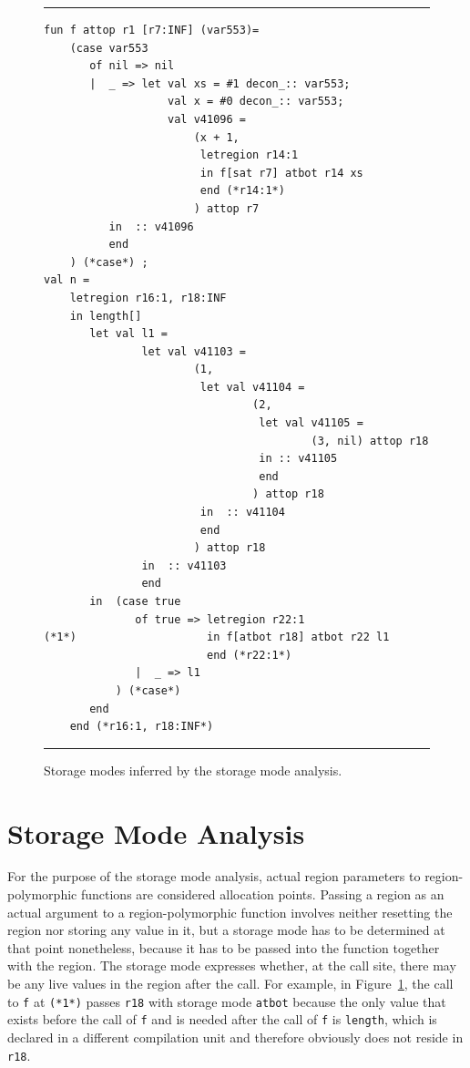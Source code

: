 \documentclass[12pt]{book}
\begin{document}
\begin{figure}
\hrule \medskip
\begin{verbatim}
fun f attop r1 [r7:INF] (var553)= 
    (case var553 
       of nil => nil
       |  _ => let val xs = #1 decon_:: var553; 
                   val x = #0 decon_:: var553; 
                   val v41096 = 
                       (x + 1, 
                        letregion r14:1 
                        in f[sat r7] atbot r14 xs 
                        end (*r14:1*)
                       ) attop r7
          in  :: v41096
          end 
    ) (*case*) ; 
val n = 
    letregion r16:1, r18:INF 
    in length[] 
       let val l1 = 
               let val v41103 = 
                       (1, 
                        let val v41104 = 
                                (2, 
                                 let val v41105 = 
                                         (3, nil) attop r18 
                                 in :: v41105 
                                 end 
                                ) attop r18
                        in  :: v41104
                        end 
                       ) attop r18
               in  :: v41103
               end 
       in  (case true 
              of true => letregion r22:1 
(*1*)                    in f[atbot r18] atbot r22 l1 
                         end (*r22:1*)
              |  _ => l1
           ) (*case*) 
       end  
    end (*r16:1, r18:INF*)
\end{verbatim}
\caption{Storage modes inferred by the storage mode analysis.}
\label{sma1.fig}
\medskip
\hrule
\end{figure}

\section{Storage Mode Analysis}
\label{sma.sec}
For the purpose of the storage mode analysis, actual region
parameters to region-polymorphic functions are considered allocation
points. Passing a region as an actual argument to a region-polymorphic
function involves neither resetting the region nor storing any value
in it, but a storage mode has to be determined at that point
nonetheless, because it has to be passed into the function together with
the region. The storage mode expresses whether, at the call site,
there may be any live values in the region after the call. For
example, in Figure~\ref{sma1.fig}, the call to {\tt f}
at {\tt (*1*)} passes {\tt r18} with storage
mode {\tt atbot} because the only value that exists before the call
of {\tt f} and is needed after the call of {\tt f} is {\tt length},
which is declared in a different compilation unit and therefore
obviously does not reside in {\tt r18}.
\end{document}
